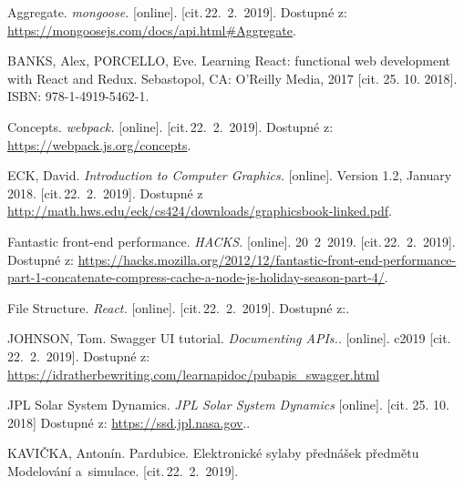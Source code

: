 \documentclass[a4paper,12pt]{article}
\begin{document}

\clearpage {} {}

\begin{thebibliography}{99}	%


Aggregate.
\textit{mongoose.} [online]. [cit.\,22.~2.~2019].
Dostupné z: {\ttfamily \url{https://mongoosejs.com/docs/api.html#Aggregate}}.

BANKS, Alex, PORCELLO, Eve. Learning React: functional web development with React and Redux. Sebastopol, CA: O'Reilly Media, 2017 [cit. 25. 10. 2018]. ISBN: 978-1-4919-5462-1.

Concepts.
\textit{webpack.} [online]. [cit.\,22.~2.~2019].
Dostupné z: {\ttfamily \url{https://webpack.js.org/concepts}}.

ECK, David. \textit{Introduction to Computer Graphics.} [online]. Version 1.2, January 2018. [cit.\,22.~2.~2019]. Dostupné z \url{http://math.hws.edu/eck/cs424/downloads/graphicsbook-linked.pdf}.

Fantastic front-end performance.
\textit{HACKS.} [online]. 20~2~2019. [cit.\,22.~2.~2019].
Dostupné z: {\ttfamily \url{https://hacks.mozilla.org/2012/12/fantastic-front-end-performance-part-1-concatenate-compress-cache-a-node-js-holiday-season-part-4/}}.

File Structure.
\textit{React.} [online]. [cit.\,22.~2.~2019].
Dostupné z:.

JOHNSON, Tom. Swagger UI tutorial. \textit{Documenting APIs.}. [online]. c2019 [cit.\,22.~2.~2019]. Dostupné z: {\ttfamily \url{https://idratherbewriting.com/learnapidoc/pubapis_swagger.html}}

JPL Solar System Dynamics. \textit{JPL Solar System Dynamics} [online]. [cit. 25. 10. 2018] Dostupné z: \url{https://ssd.jpl.nasa.gov}..

KAVIČKA, Antonín. Pardubice. Elektronické sylaby přednášek předmětu Modelování a~simulace. [cit.\,22.~2.~2019].


\end{thebibliography}
\end{document}
